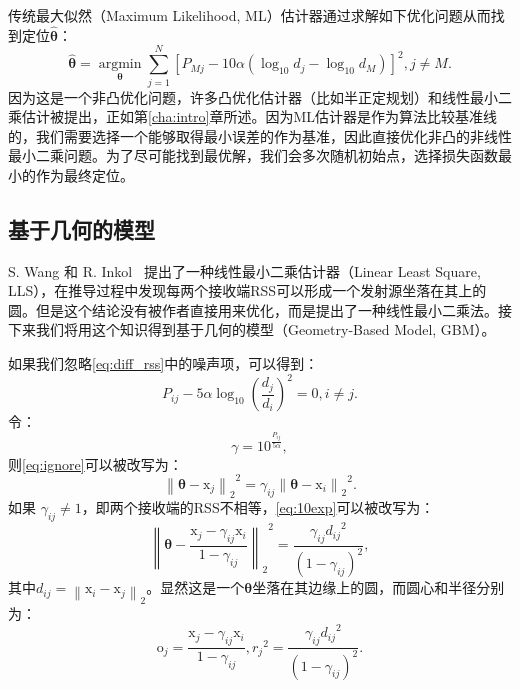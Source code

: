传统最大似然（Maximum Likelihood, ML）估计器通过求解如下优化问题从而找到定位$\bm{\hat{\theta}}$：
\begin{equation}
\widehat {\bm{\theta }} = \mathop {\arg \min }\limits_{\bm{\theta }} \sum\limits_{j = 1}^N {{{[{P_{Mj}} - 10\alpha ({{\log }_{10}}d_j - {{\log }_{10}}d_M)]}^2}}, j \neq M. \label{eq:ml}
\end{equation}
因为这是一个非凸优化问题，许多凸优化估计器（比如半正定规划）和线性最小二乘估计被提出，正如第\ref{cha:intro}章所述。因为ML估计器是作为算法比较基准线的，我们需要选择一个能够取得最小误差的作为基准，因此直接优化非凸的非线性最小二乘问题。为了尽可能找到最优解，我们会多次随机初始点，选择损失函数最小的作为最终定位。

\subsection{基于几何的模型}

S. Wang 和 R. Inkol~\cite{wang2011near} 提出了一种线性最小二乘估计器（Linear Least Square, LLS），在推导过程中发现每两个接收端RSS可以形成一个发射源坐落在其上的圆。但是这个结论没有被作者直接用来优化，而是提出了一种线性最小二乘法。接下来我们将用这个知识得到基于几何的模型（Geometry-Based Model, GBM）。

如果我们忽略\eqref{eq:diff_rss}中的噪声项，可以得到：
\begin{equation}
{P_{ij}} - 5\alpha {\log _{10}}({\dfrac{d_j}{d_i}})^2 = 0, i \neq j. \label{eq:ignore}
\end{equation}
令：
\begin{equation}
\gamma = 10^{\frac{P_{ij}}{5\alpha}}, \label{eq:gamma}
\end{equation}
则\eqref{eq:ignore}可以被改写为：
\begin{equation}
{\left\| {\bm{\theta}  - \bm{\mathrm{x}}_j} \right\|_2}^2 = {\gamma _{ij}}{\left\| {\bm{\theta}  - \bm{\mathrm{x}}_i} \right\|_2}^2. \label{eq:10exp}
\end{equation}
如果 $\gamma _{ij} \neq 1$，即两个接收端的RSS不相等，\eqref{eq:10exp}可以被改写为：
\begin{equation}
{\left\| {\bm{\theta}  - \frac{\bm{\mathrm{x}}_j - \gamma_{ij}\bm{\mathrm{x}}_i}{1 - \gamma_{ij}}} \right\|_2}^2 = \frac{\gamma_{ij}{d_{ij}}^2}{(1 - \gamma_{ij})^2}, \label{eq:circle}
\end{equation}
其中$d_{ij} = \left\| \bm{\mathrm{x}}_i  - \bm{\mathrm{x}}_j \right\|_2$。显然这是一个$\bm{\theta}$坐落在其边缘上的圆，而圆心和半径分别为：
\begin{equation}
\bm{\mathrm{o}}_j = \frac{\bm{\mathrm{x}}_j - \gamma_{ij}\bm{\mathrm{x}}_i}{1 - \gamma_{ij}}, {r_j}^2 = \frac{\gamma_{ij}{d_{ij}}^2}{(1 - \gamma_{ij})^2}. \label{eq:oR}
\end{equation}

